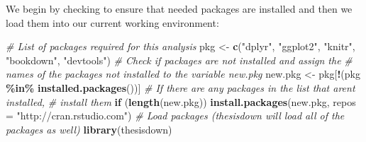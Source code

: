 \documentclass[12pt,twoside]{reedthesis}
\newenvironment{Shaded}{\begin{snugshade}}{\end{snugshade}}
\newcommand{\AttributeTok}[1]{\textcolor[rgb]{0.13,0.29,0.53}{#1}}
\newcommand{\CommentTok}[1]{\textcolor[rgb]{0.56,0.35,0.01}{\textit{#1}}}
\newcommand{\ControlFlowTok}[1]{\textcolor[rgb]{0.13,0.29,0.53}{\textbf{#1}}}
\newcommand{\FunctionTok}[1]{\textcolor[rgb]{0.13,0.29,0.53}{\textbf{#1}}}
\newcommand{\NormalTok}[1]{#1}
\newcommand{\OtherTok}[1]{\textcolor[rgb]{0.56,0.35,0.01}{#1}}
\newcommand{\SpecialCharTok}[1]{\textcolor[rgb]{0.81,0.36,0.00}{\textbf{#1}}}
\newcommand{\StringTok}[1]{\textcolor[rgb]{0.31,0.60,0.02}{#1}}
\begin{document}
We begin by checking to ensure that needed packages are installed and then we load them into our current working environment:
\begin{Shaded}
\begin{Highlighting}[]
\CommentTok{\# List of packages required for this analysis}
\NormalTok{pkg }\OtherTok{\textless{}{-}} \FunctionTok{c}\NormalTok{(}\StringTok{"dplyr"}\NormalTok{, }\StringTok{"ggplot2"}\NormalTok{, }\StringTok{"knitr"}\NormalTok{, }\StringTok{"bookdown"}\NormalTok{, }\StringTok{"devtools"}\NormalTok{)}
\CommentTok{\# Check if packages are not installed and assign the}
\CommentTok{\# names of the packages not installed to the variable new.pkg}
\NormalTok{new.pkg }\OtherTok{\textless{}{-}}\NormalTok{ pkg[}\SpecialCharTok{!}\NormalTok{(pkg }\SpecialCharTok{\%in\%} \FunctionTok{installed.packages}\NormalTok{())]}
\CommentTok{\# If there are any packages in the list that aren\textquotesingle{}t installed,}
\CommentTok{\# install them}
\ControlFlowTok{if}\NormalTok{ (}\FunctionTok{length}\NormalTok{(new.pkg))}
  \FunctionTok{install.packages}\NormalTok{(new.pkg, }\AttributeTok{repos =} \StringTok{"http://cran.rstudio.com"}\NormalTok{)}
\CommentTok{\# Load packages (thesisdown will load all of the packages as well)}
\FunctionTok{library}\NormalTok{(thesisdown)}
\end{Highlighting}
\end{Shaded}
\clearpage
\end{document}
